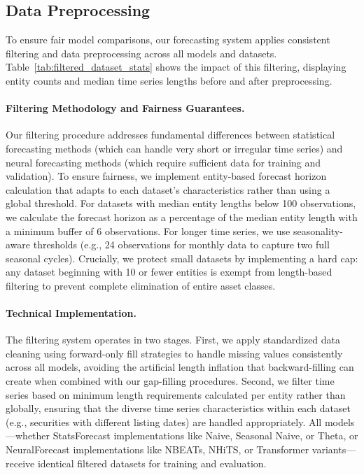 \documentclass{article}
\begin{document}
\subsection{Data Preprocessing}

To ensure fair model comparisons, our forecasting system applies consistent filtering and data preprocessing across all models and datasets. Table~\ref{tab:filtered_dataset_stats} shows the impact of this filtering, displaying entity counts and median time series lengths before and after preprocessing. 

\paragraph{Filtering Methodology and Fairness Guarantees.} Our filtering procedure addresses fundamental differences between statistical forecasting methods (which can handle very short or irregular time series) and neural forecasting methods (which require sufficient data for training and validation). To ensure fairness, we implement entity-based forecast horizon calculation that adapts to each dataset's characteristics rather than using a global threshold. For datasets with median entity lengths below 100 observations, we calculate the forecast horizon as a percentage of the median entity length with a minimum buffer of 6 observations. For longer time series, we use seasonality-aware thresholds (e.g., 24 observations for monthly data to capture two full seasonal cycles). Crucially, we protect small datasets by implementing a hard cap: any dataset beginning with 10 or fewer entities is exempt from length-based filtering to prevent complete elimination of entire asset classes.

\paragraph{Technical Implementation.} The filtering system operates in two stages. First, we apply standardized data cleaning using forward-only fill strategies to handle missing values consistently across all models, avoiding the artificial length inflation that backward-filling can create when combined with our gap-filling procedures. Second, we filter time series based on minimum length requirements calculated per entity rather than globally, ensuring that the diverse time series characteristics within each dataset (e.g., securities with different listing dates) are handled appropriately. All models—whether StatsForecast implementations like Naive, Seasonal Naive, or Theta, or NeuralForecast implementations like NBEATs, NHiTS, or Transformer variants—receive identical filtered datasets for training and evaluation.
\end{document}
